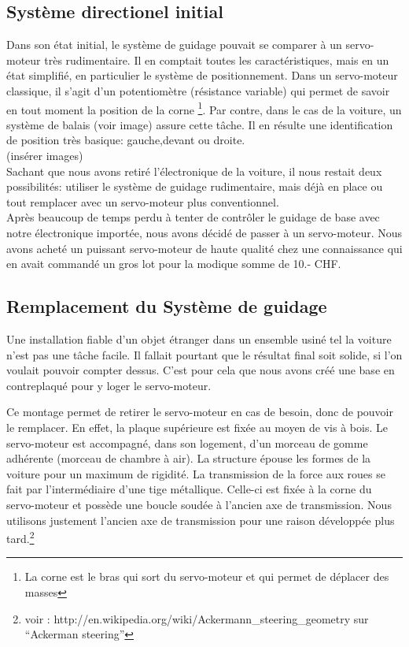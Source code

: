 \documentclass[a4paper,11pt]{report}
\begin{document}
{\subsection{Système directionel initial}
Dans son état initial, le système de guidage pouvait se comparer à un
servo-moteur très rudimentaire. Il en comptait toutes les caractéristiques, mais en
un état simplifié, en particulier le système de positionnement. Dans un servo-moteur
classique, il s'agit d'un potentiomètre (résistance variable) qui permet
de savoir en tout moment la position de la corne \footnote{La corne est le bras qui sort du servo-moteur et qui permet de déplacer des masses}. Par contre, dans le cas de
la voiture, un système de balais (voir image) assure cette tâche. Il en
résulte une identification de position très basique: gauche,devant ou
droite.\\
(ins\'erer images)\\
Sachant que nous avons retiré l'électronique de la voiture, il nous restait
deux possibilités: utiliser le système de guidage rudimentaire, mais
déjà en place ou tout remplacer avec un servo-moteur plus conventionnel.\\
Apr\`es beaucoup de temps perdu à tenter de contrôler le guidage de base
avec notre électronique importée, nous avons décidé de passer à un servo-moteur. Nous avons
acheté un puissant servo-moteur de haute qualité chez une connaissance qui en
avait commandé un gros lot pour la modique somme de 10.- CHF.

\subsection{Remplacement du Système de guidage}
Une installation fiable d'un objet étranger dans un ensemble usiné tel la
voiture n'est pas une tâche facile. Il fallait pourtant que le résultat final
soit solide, si l'on voulait pouvoir compter dessus. C'est pour cela que nous avons
créé une base en contreplaqué pour y loger le servo-moteur.

Ce montage permet de retirer le servo-moteur en cas de besoin, donc de pouvoir le
remplacer. En effet, la plaque supérieure est fixée au moyen de vis \`a
bois. Le servo-moteur est accompagné, dans son logement, d'un morceau de gomme
adhérente (morceau de chambre à air). La structure épouse les formes de
la voiture pour un maximum de rigidité. La transmission de la force aux
roues se fait par l'intermédiaire d'une tige métallique. Celle-ci est
fixée à la corne du servo-moteur et possède une boucle soudée à l'ancien axe de
transmission. Nous utilisons justement l'ancien axe de transmission pour une
raison développée plus tard.\footnote{voir :
http://en.wikipedia.org/wiki/Ackermann\_steering\_geometry sur
``Ackerman steering''}

}
\end{document}
